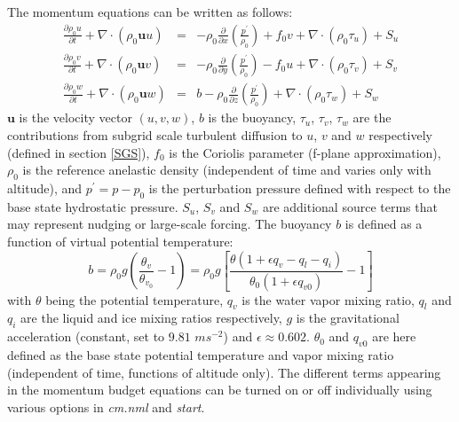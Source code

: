\documentclass[12pt,A4,french]{article}
\begin{document}
The momentum equations can be written as follows:
\begin{eqnarray}
\frac{\partial \rho_0 u}{\partial t} + \nabla\cdot\left(\rho_0 \mathbf{u} u\right) &=& - \rho_0 \frac{\partial}{\partial x}\left(\frac{p^{\prime}}{\rho_0}\right)
+ f_0 v + \nabla\cdot\left(\rho_0 \tau_{u}\right) + S_u \label{momu}\\
\frac{\partial \rho_0 v}{\partial t} + \nabla\cdot\left(\rho_0 \mathbf{u} v\right) &=& - \rho_0 \frac{\partial}{\partial y}\left(\frac{p^{\prime}}{\rho_0}\right)
- f_0 u + \nabla\cdot\left(\rho_0 \tau_{v}\right) + S_v \label{momv} \\
\frac{\partial \rho_0 w}{\partial t} + \nabla\cdot\left(\rho_0 \mathbf{u} w\right) &=& b - \rho_0 \frac{\partial}{\partial z}\left(\frac{p^{\prime}}{\rho_0}\right)
+ \nabla\cdot\left(\rho_0 \tau_{w}\right) + S_w \label{momw}
\end{eqnarray}
${\mathbf u}$ is the velocity vector $\left(u,v,w\right)$, $b$ is the  buoyancy, $\tau_u$, $\tau_v$, $\tau_w$ are the contributions from subgrid scale turbulent diffusion to $u$, $v$ and $w$ respectively (defined in section \ref{SGS}), $f_0$ is the Coriolis parameter (f-plane approximation), $\rho_0$ is the reference anelastic density (independent of time and varies only with altitude), and $p^{\prime} = p - p_0$ is the perturbation pressure defined with respect to the base state hydrostatic pressure. $S_u$, $S_v$ and $S_w$ are additional source terms that may represent nudging or large-scale forcing. The buoyancy $b$ is defined as a function of virtual potential temperature:
\begin{equation}
b = \rho_0 g \left(\frac{\theta_v}{\theta_v_0} - 1\right) = \rho_0 g \left[\frac{\theta\left(1 + \epsilon q_v - q_l - q_i\right)}{\theta_0\left(1 + \epsilon q_{v0}\right)} - 1\right]
\end{equation}
with $\theta$ being the potential temperature, $q_v$ is the water vapor mixing ratio, $q_l$ and $q_i$ are the liquid and ice mixing ratios respectively, $g$ is the gravitational acceleration (constant, set to $9.81$ $m s^{-2}$) and $\epsilon \approx 0.602$. $\theta_0$ and $q_{v0}$ are here defined as the base state potential temperature and vapor mixing ratio (independent of time, functions of altitude only). The different terms appearing in the momentum budget equations can be turned on or off individually using various options in {\it cm.nml} and {\it start}. 
\end{document}
